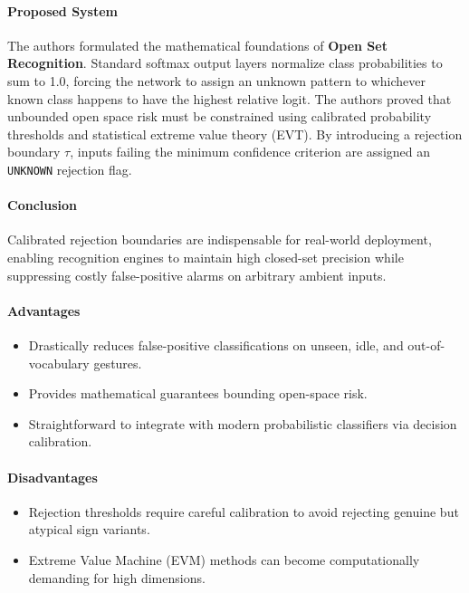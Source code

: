 \paragraph{Proposed System}
The authors formulated the mathematical foundations of \textbf{Open Set Recognition}. Standard softmax output layers normalize class probabilities to sum to 1.0, forcing the network to assign an unknown pattern to whichever known class happens to have the highest relative logit. The authors proved that unbounded open space risk must be constrained using calibrated probability thresholds and statistical extreme value theory (EVT). By introducing a rejection boundary $\tau$, inputs failing the minimum confidence criterion are assigned an \texttt{UNKNOWN} rejection flag.

\paragraph{Conclusion}
Calibrated rejection boundaries are indispensable for real-world deployment, enabling recognition engines to maintain high closed-set precision while suppressing costly false-positive alarms on arbitrary ambient inputs.

\paragraph{Advantages}
\begin{itemize}
    \item Drastically reduces false-positive classifications on unseen, idle, and out-of-vocabulary gestures.
    \item Provides mathematical guarantees bounding open-space risk.
    \item Straightforward to integrate with modern probabilistic classifiers via decision calibration.
\end{itemize}

\paragraph{Disadvantages}
\begin{itemize}
    \item Rejection thresholds require careful calibration to avoid rejecting genuine but atypical sign variants.
    \item Extreme Value Machine (EVM) methods can become computationally demanding for high dimensions.
\end{itemize}


